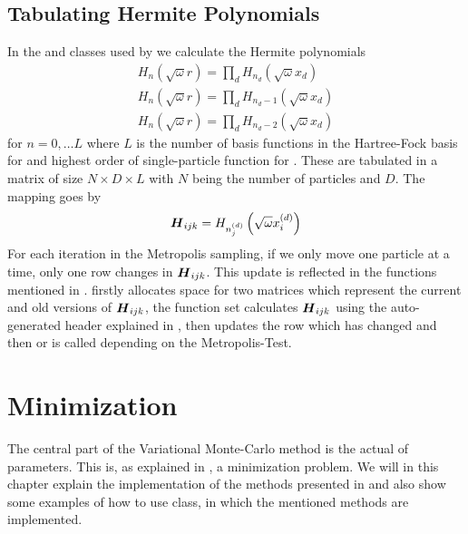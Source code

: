 \subsection{Tabulating Hermite Polynomials}
    In the  and  classes
    used by  we calculate the Hermite polynomials
        \begin{equation}
            \begin{aligned}
                H_n(\sqrt{\omega}r) = \prod_d
                H_{n_d}\left(\sqrt{\omega}x_d\right) \\
                H_n(\sqrt{\omega}r) = \prod_d
                H_{n_d-1}\left(\sqrt{\omega}x_d\right) \\
                H_n(\sqrt{\omega}r) = \prod_d
                H_{n_d-2}\left(\sqrt{\omega}x_d\right)
            \end{aligned}
        \end{equation}
    for $n=0,\dots L$ where $L$ is the number of basis functions in the
    Hartree-Fock basis for  and highest order of
    single-particle function for . These are
    tabulated in a matrix of size $N\times D\times L$ with $N$ being the number
    of particles and $D$. The mapping goes by
        \begin{equation}
            \boldsymbol{{H}}_{ijk} = H_{n^{(d)}_j}\left(\sqrt{\omega}x^{(d)}_i\right)
        \end{equation}
    For each iteration in the Metropolis sampling, if we only move one particle
    at a time, only one row changes in $\boldsymbol{{H}}_{ijk}$. This update is
    reflected in the functions mentioned in .
     firstly allocates space for two matrices
    which represent the current and old versions of $\boldsymbol{{H}}_{ijk}$, the
     function set calculates $\boldsymbol{{H}}_{ijk}$ using the
    auto-generated header explained in ,
     then updates the row which has changed and then
     or  is called depending on the
    Metropolis-Test.

\section{Minimization}
    The central part of the Variational Monte-Carlo method is the actual
     of parameters. This is, as explained in ,
    a minimization problem. We will in this chapter explain the implementation
    of the methods presented in  and also show some examples of
    how to use  class, in which the mentioned methods are
    implemented.

